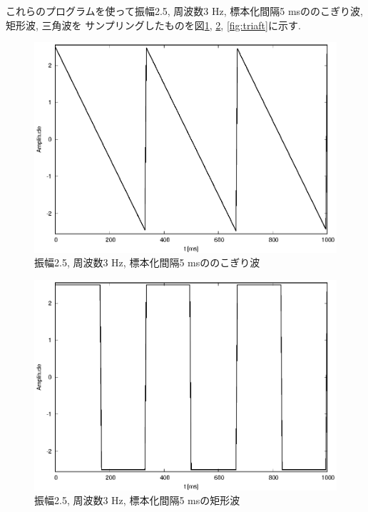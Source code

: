 \documentclass[titlepage]{jsarticle}
\begin{document}
        これらのプログラムを使って振幅2.5, 周波数3 Hz, 標本化間隔5 msののこぎり波, 矩形波, 三角波を
        サンプリングしたものを図\ref{fig:sawaft}, \ref{fig:squaft}, \ref{fig:triaft}に示す.

        \begin{figure}[h]
            \centering
            \includegraphics[width=0.8\hsize]{images/sawaft.eps}
            \caption{振幅2.5, 周波数3 Hz, 標本化間隔5 msののこぎり波}
            \label{fig:sawaft}
        \end{figure}

        \begin{figure}[h]
            \centering
            \includegraphics[width=0.8\hsize]{images/squaft.eps}
            \caption{振幅2.5, 周波数3 Hz, 標本化間隔5 msの矩形波}
            \label{fig:squaft}
        \end{figure}
\end{document}
